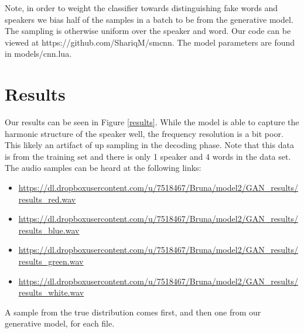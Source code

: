\documentclass{article}
\begin{document}
Note, in order to weight the classifier towards distinguishing fake words and speakers we bias half of the samples in a batch to be from the generative model. The sampling is otherwise uniform over the speaker and word. Our code can be viewed at https://github.com/ShariqM/smcnn. The model parameters are found in models/cnn.lua.

\section{Results}
Our results can be seen in Figure \ref{results}. While the model is able to capture the harmonic structure of the speaker well, the frequency resolution is a bit poor. This likely an artifact of up sampling in the decoding phase. Note that this data is from the training set and there is only 1 speaker and 4 words in the data set. The audio samples can be heard at the following links:
\begin{itemize}
\item \href{https://dl.dropboxusercontent.com/u/7518467/Bruna/model2/GAN\_results/results\_red.wav}{https://dl.dropboxusercontent.com/u/7518467/Bruna/model2/GAN\_results/results\_red.wav}
\item \href{https://dl.dropboxusercontent.com/u/7518467/Bruna/model2/GAN\_results/results\_blue.wav}{https://dl.dropboxusercontent.com/u/7518467/Bruna/model2/GAN\_results/results\_blue.wav}
\item \href{https://dl.dropboxusercontent.com/u/7518467/Bruna/model2/GAN\_results/results\_green.wav}{https://dl.dropboxusercontent.com/u/7518467/Bruna/model2/GAN\_results/results\_green.wav}
\item \href{https://dl.dropboxusercontent.com/u/7518467/Bruna/model2/GAN\_results/results\_white.wav}{https://dl.dropboxusercontent.com/u/7518467/Bruna/model2/GAN\_results/results\_white.wav}
\end{itemize}

A sample from the true distribution comes first, and then one from our generative model, for each file.
\end{document}
